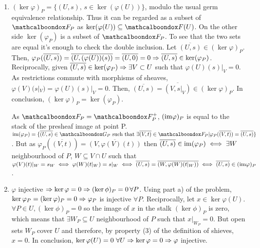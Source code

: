 \begin{sol}
	\begin{enumerate}[label=\alph*)]
		\item $(\ker \varphi)_P = \{(U,s), \, s \in \ker(\varphi(U))\}$, modulo the usual germ equivalence relationship. Thus it can be regarded as a subset of $\sF_P$ as $\ker(\varphi(U)) \subseteq \sF(U)$. On the other side $\ker(\varphi_P)$ is a subset of $\sF_P$. To see that the two sets are equal it's enough to check the double inclusion. Let $\overline{(U,s)} \in (\ker \varphi)_P$. Then, $\varphi_P(\overline{(U,s)}) = \overline{(U, (\varphi(U))(s))} = \overline{(U,0)} = 0 \Rightarrow \overline{(U,s)} \in \ker(\varphi_P)$. Reciprocally, given $\overline{(U,s)} \in \ker(\varphi_P) \Rightarrow \exists V \subset U$ such that $\varphi(U)(s)|_V = 0$. As restrictions commute with morphisms of sheaves, $ \varphi(V)(s|_V) = \varphi(U)(s)|_V = 0$. Then, $\overline{(U,s)} = \overline{(V,s|_V)} \in (\ker\varphi)_P$. In conclusion, $(\ker \varphi)_P = \ker(\varphi_P)$.

		As $\sF_P = \sF^{+}_P$, $(\mathrm{im} \varphi)_P$ is equal to the stack of the presheaf image at point P. $\ima (\varphi_P) = \{\overline{(U,s)} \in \sG_P \text{ such that } \exists \overline{(V,t)} \in \sF_P | \varphi_P(\overline{(V,t)}) = \overline{(U,s)}\}$. But as $\varphi_P(\overline{(V,t)}) = \overline{(V, \varphi(V)(t))}$ then $\overline{(U,s)} \in \mathrm{im} (\varphi_P) \iff \exists W$ neighbourhood of $P$, $W \subseteq V \cap U$ such that $\varphi(V)(t)|_W = s_W \iff \varphi(W)(t|_W) = s|_W \iff \overline{(U,s)} = \overline{(W,\varphi(W)(t|_W))} \iff \overline{(U,s)} \in (\mathrm{im} \varphi)_P$.

		\item $\varphi$ injective $\Rightarrow \ker \varphi = 0 \Rightarrow (\ker \phi)_P = 0 \, \forall P$. Using part a) of the problem, $\ker \varphi_P = (\ker \varphi)_P = 0 \Rightarrow \varphi_P$ is injective $\forall P$. Reciprocally, let $x \in \ker \varphi(U)$. $\forall P \in U, (\ker \phi)_P = 0$ so the image of $x$ in the stalk $(\ker \phi)_P$ is zero, which means that $\exists W_P \subseteq U$ neighbourhood of $P$ such that $x|_{W_P} = 0$. But open sets $W_P$ cover $U$ and therefore, by property (3) of the definition of shieves, $x = 0$. In conclusion, $\ker \varphi(U) = 0 \, \, \forall U \Rightarrow \ker \varphi = 0 \Rightarrow \varphi$ injective.


\end{enumerate}
\end{sol}
